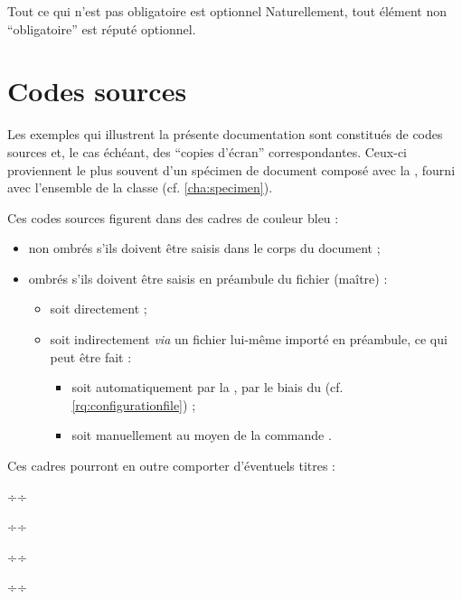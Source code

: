 \begin{dbremark}{Tout ce qui n'est pas obligatoire est optionnel}{}
  Naturellement, tout élément non \enquote{obligatoire} est réputé optionnel.
\end{dbremark}

\section{Codes sources}
\label{sec:codes-sources}

Les exemples qui illustrent la présente documentation sont constitués de codes
sources et, le cas échéant, des \enquote{copies d'écran} correspondantes.
Ceux-ci proviennent le plus souvent d'un spécimen de document composé avec la
\yatcl, fourni avec l'ensemble de la classe (cf. \vref{cha:specimen}).

Ces codes sources figurent dans des cadres de couleur bleu :
\begin{itemize}
\item non ombrés s'ils doivent être saisis dans le corps du document ;
\item ombrés s'ils doivent être saisis en préambule du fichier (maître) :
  \begin{itemize}
  \item soit directement ;
  \item soit indirectement \emph{via} un fichier lui-même importé en
    préambule, ce qui peut être fait :
    \begin{itemize}
    \item soit automatiquement par la \yatcl{}, par le biais du
      \File{\configurationfile} (cf. \vref{rq:configurationfile}) ;
    \item soit manuellement au moyen de la commande .
    \end{itemize}
  \end{itemize}
\end{itemize}
Ces cadres pourront en outre comporter d'éventuels titres :
\begin{multicols}{2}
\begin{bodycode}
÷÷
\end{bodycode}
\begin{bodycode}[title=\meta{titre}]
÷÷
\end{bodycode}
\begin{preamblecode}
÷÷
\end{preamblecode}
\begin{preamblecode}[title=\meta{titre}]
÷÷
\end{preamblecode}
\end{multicols}

